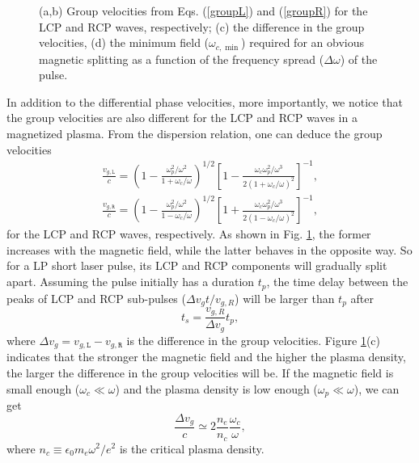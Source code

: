 \documentclass[%
aps,
preprint,
showpacs,
preprintnumbers,
 amsmath,
 amssymb,
 prl,
]{revtex4-1}
\begin{document}
\begin{figure}[htbp]
\centering
{}
\caption{(a,b) Group velocities from Eqs. (\ref{groupL}) and (\ref{groupR}) for the LCP and RCP waves, respectively;
(c) the difference in the group velocities, (d) the minimum field ($\omega_{c,\min}$) required for an obvious magnetic splitting as a function of the  frequency spread ($\Delta\omega$) of the pulse.}
\label{figAnalysis}
\end{figure}

In addition to the differential phase velocities, more importantly, we notice that the group velocities are also different for the LCP and RCP waves in a magnetized plasma. From the dispersion relation, one can deduce the group velocities
\begin{align}
\frac{v_{g,\texttt{L}}}{c} = \left(1-\frac{\omega_p^2/\omega^2}{1 + \omega_c/\omega}\right)^{1/2} \left[1-\frac{\omega_c \omega_p^2/ \omega^3}{2(1+\omega_c/\omega)^2} \right]^{-1},  \label{groupL} \\
\frac{v_{g,\texttt{R}}}{c} = \left(1-\frac{\omega_p^2/\omega^2}{1 - \omega_c/\omega}\right)^{1/2} \left[1+\frac{\omega_c \omega_p^2/ \omega^3}{2(1-\omega_c/\omega)^2} \right]^{-1}, \label{groupR}
\end{align}
for the LCP and RCP waves, respectively.
As shown in Fig. \ref{figAnalysis}, the former increases with the magnetic field, while the latter behaves in the opposite way.
So for a LP short laser pulse, its LCP and RCP components will gradually split apart. Assuming the pulse initially has a duration $t_p$, the time delay between the peaks of LCP and RCP sub-pulses ($\Delta v_gt/ v_{g,R}$) will be larger than $t_p$ after
\begin{equation}
t_s = \frac{v_{g,R}}{\Delta v_g} t_p, \label{tSplit}
\end{equation}
where $\Delta v_g=v_{g,\texttt{L}}-v_{g,\texttt{R}}$ is the difference in the group velocities. Figure \ref{figAnalysis}(c) indicates that the stronger the magnetic field and the higher the plasma density, the larger the difference in the group velocities will be.
If the magnetic field is small enough ($\omega_c \ll \omega$) and the plasma density is low enough ($\omega_p \ll \omega$), we can get
\begin{equation}
\frac{\Delta v_g}{c} \simeq 2 \frac{ n_e }{n_c} \frac{ \omega_c}{ \omega}, \label{deltaVg}
\end{equation}
where $n_c\equiv \epsilon_0 m_e \omega^2/e^2$ is the critical plasma density.
\end{document}
